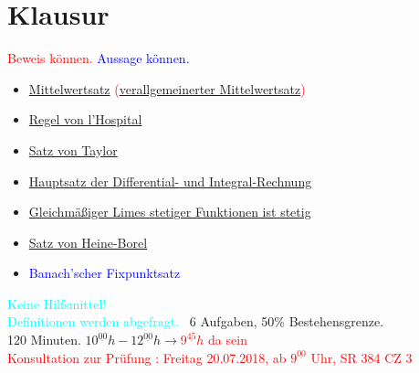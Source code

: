 \section*{Klausur}
\textcolor{red}{Beweis können.}
\textcolor{blue}{Aussage können.}
\begin{itemize}
	\item \textcolor{red}{\hyperref[vl_07_MWS]{Mittelwertsatz} (\hyperref[satz_9]{verallgemeinerter Mittelwertsatz})}
	\item \textcolor{blue}{\hyperref[regel_von_hospital]{Regel von l'Hospital}}
	\item \textcolor{red}{\hyperref[satz_von_taylor]{Satz von Taylor}}
	\item \textcolor{red}{\hyperref[vl_12_satz_02]{Hauptsatz der Differential- und Integral-Rechnung}}
	\item \textcolor{red}{\hyperref[vl_17_satz_2]{Gleichmäßiger Limes stetiger Funktionen ist stetig}}
	\item \textcolor{blue}{\hyperref[satz_v_heine_borel]{Satz von Heine-Borel}}
	\item \textcolor{blue}{Banach'scher Fixpunktsatz}
\end{itemize}
\textcolor{cyan}{Keine Hilfsmittel!}\\
\textcolor{cyan}{Definitionen werden abgefragt.}
~6 Aufgaben, 50\% Bestehensgrenze.\\
120 Minuten. $10^{\underline{00}}h - 12^{\underline{00}}h \rightarrow$\textcolor{red}{$9^{\underline{45}}h$ da sein}\\

\textcolor{red}{Konsultation zur Prüfung : Freitag 20.07.2018, 
ab $9^{\underline{00}}$ Uhr, SR 384 CZ 3}